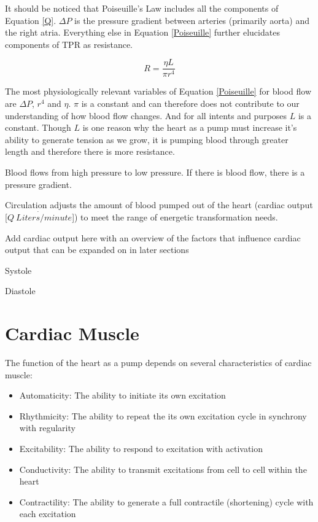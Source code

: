 It should be noticed that Poiseuille's Law includes all the components of Equation \ref{Q}. $\Delta P$ is the pressure gradient between arteries (primarily aorta) and the right atria. Everything else in Equation \ref{Poiseuille} further elucidates components of TPR as resistance.

\begin{equation}
    R = \frac{\eta L}{\pi r^4}
    \label{resistance}
\end{equation}

The most physiologically relevant variables of Equation \ref{Poiseuille} for blood flow are $\Delta P$, $r^4$ and $\eta$. $\pi$ is a constant and can therefore does not contribute to our understanding of how blood flow changes. And for all intents and purposes $L$ is a constant. Though $L$ is one reason why the heart as a pump must increase it's ability to generate tension as we grow, it is pumping blood through greater length and therefore there is more resistance. 


Blood flows from high pressure to low pressure. If there is blood flow, there is a pressure gradient. 


Circulation adjusts the amount of blood pumped out of the heart (cardiac output [$\dot{Q \ Liters/minute}$]) to meet the range of energetic transformation needs.


Add cardiac output here with an overview of the factors that influence cardiac output that can be expanded on in later sections

Systole

Diastole




\section{Cardiac Muscle}

The function of the heart as a pump depends on several characteristics of cardiac muscle:

\begin{itemize}
    
    \item Automaticity: The ability to initiate its own excitation
    \item Rhythmicity: The ability to repeat the its own excitation cycle in synchrony with regularity
    \item Excitability: The ability to respond to excitation with activation
    \item Conductivity: The ability to transmit excitations from cell to cell within the heart
    \item Contractility: The ability to generate a full contractile (shortening) cycle with each excitation
 
\end{itemize}

